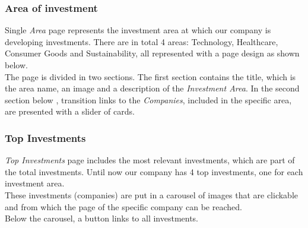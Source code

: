 \documentclass[../../DD.tex]{subfiles}
\begin{document}
	\subsubsection{Area of investment}
		Single \textit{Area} page represents the investment area at which our company is developing investments. There are in total 4 areas: Technology, Healthcare, Consumer Goods and Sustainability, all represented with a page design as shown below.\\
        The page is divided in two sections. The first section contains the title, which is the area name, an image and a description of the \textit{Investment Area}. In the second section below , transition links to the \textit{Companies}, included in the specific area, are presented with a slider of cards.
		\newline
\newpage
	\subsubsection{Top Investments}
		\textit{Top Investments} page includes the most relevant investments, which are part of the total investments. Until now our company has 4 top investments, one for each investment area.\\ These investments (companies) are put in a carousel of images that are clickable and from which the page of the specific company can be reached.\\
        Below the carousel, a button links to all investments.
		\newline
	
\end{document}
